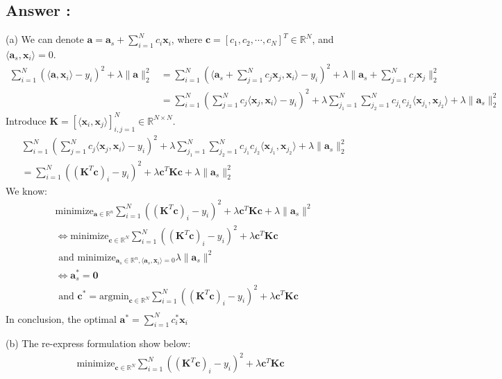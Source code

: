 \documentclass[a4paper,12pt]{article}
\newcommand{\R}{\mathbb{R}}
\begin{document}
\subsection*{Answer :}
(a) We can denote \(\bm{a} = \bm{a}_s + \sum_{i=1}^N c_i \bm{x}_i\), where \(\bm{c} = [c_1, c_2, \cdots, c_N]^T \in \R^N\), and \(\langle \bm{a}_s, \bm{x}_i\rangle = 0\).
\begin{align*}
    \sum_{i = 1}^N (\langle \bm{a}, \bm{x}_i\rangle - y_i)^2 + \lambda\|\bm{a}\|_2^2 &= \sum_{i = 1}^N (\langle \bm{a}_s + \sum_{j=1}^N c_j \bm{x}_j, \bm{x}_i\rangle - y_i)^2 + \lambda\| \bm{a}_s + \sum_{j=1}^N c_j \bm{x}_j\|_2^2   \\
    &= \sum_{i = 1}^N ( \sum_{j=1}^N c_j \langle \bm{x}_j, \bm{x}_i\rangle - y_i)^2 + \lambda\sum_{j_1=1}^N \sum_{j_2=1}^N c_{j_1}c_{j_2} \langle \bm{x}_{j_1},\bm{x}_{j_2}\rangle + \lambda \|\bm{a}_s\|_2^2
\end{align*}
Introduce \(\bm{K} = [\langle \bm{x}_i, \bm{x}_j \rangle]_{i, j = 1}^N \in \R^{N \times N}\).
\begin{align*}
    &\sum_{i = 1}^N ( \sum_{j=1}^N c_j \langle \bm{x}_j, \bm{x}_i\rangle - y_i)^2 + \lambda\sum_{j_1=1}^N \sum_{j_2=1}^N c_{j_1}c_{j_2} \langle \bm{x}_{j_1},\bm{x}_{j_2}\rangle + \lambda \|\bm{a}_s\|_2^2 \\
    &=\sum_{i = 1}^N ((\bm{K}^T\bm{c})_i - y_i)^2 + \lambda \bm{c}^T \bm{K} \bm{c} + \lambda \|\bm{a}_s\|_2^2  
\end{align*}
We know:
\begin{align*}
    &\text{minimize}_{\bm{a} \in \R^n} \sum_{i = 1}^N ((\bm{K}^T\bm{c})_i - y_i)^2 + \lambda \bm{c}^T \bm{K} \bm{c} + \lambda \|\bm{a}_s\|^2   \\
    &\iff \text{minimize}_{\bm{c} \in \R^N} \sum_{i = 1}^N ((\bm{K}^T\bm{c})_i - y_i)^2 + \lambda \bm{c}^T \bm{K} \bm{c} \\ 
    &\text{ and } \text{minimize}_{\bm{a}_s \in \R^n, \langle \bm{a}_s, \bm{x}_i\rangle = 0} \lambda \|\bm{a}_s\|^2  \\
    &\iff \bm{a}_s^* = \bm{0} \\
    &\text{ and } \bm{c}^* = \text{argmin}_{\bm{c} \in \R^N} \sum_{i = 1}^N ((\bm{K}^T\bm{c})_i - y_i)^2 + \lambda \bm{c}^T \bm{K} \bm{c} \\ 
\end{align*}
In conclusion, the optimal \(\bm{a}^* = \sum_{i = 1}^N c_i^* \bm{x}_i\)

(b) 
The re-express formulation show below:
\begin{align*}
    \text{minimize}_{\bm{c} \in \R^N} \sum_{i = 1}^N ((\bm{K}^T\bm{c})_i - y_i)^2 + \lambda \bm{c}^T \bm{K} \bm{c}
\end{align*}
\end{document}
